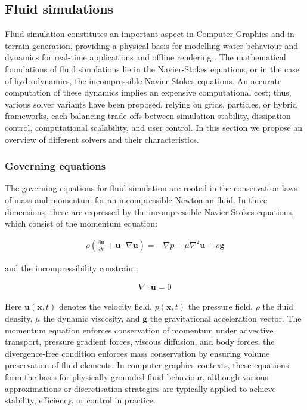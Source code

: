 
\subsection{Fluid simulations}

Fluid simulation constitutes an important aspect in Computer Graphics and in terrain generation, providing a physical basis for modelling water behaviour and dynamics for real-time applications and offline rendering \cite{Wang2024}. The mathematical foundations of fluid simulations lie in the Navier-Stokes equations, or in the case of hydrodynamics, the incompressible Navier-Stokes equations. An accurate computation of these dynamics implies an expensive computational cost; thus, various solver variants have been proposed, relying on grids, particles, or hybrid frameworks, each balancing trade-offs between simulation stability, dissipation control, computational scalability, and user control. In this section we propose an overview of different solvers and their characteristics.

\subsubsection{Governing equations}
The governing equations for fluid simulation are rooted in the conservation laws of mass and momentum for an incompressible Newtonian fluid. In three dimensions, these are expressed by the incompressible Navier-Stokes equations, which consist of the momentum equation:

\begin{align}
    \rho \left(\frac{\partial \mathbf{u}}{\partial t} + \mathbf{u}\cdot\nabla\mathbf{u}\right) = -\nabla p + \mu \nabla^2 \mathbf{u} + \rho \mathbf{g}
\end{align}

and the incompressibility constraint:

\begin{align}
    \nabla\cdot\mathbf{u} = 0
\end{align}

Here $\mathbf{u}(\mathbf{x},t)$ denotes the velocity field, $p(\mathbf{x},t)$ the pressure field, $\rho$ the fluid density, $\mu$ the dynamic viscosity, and $\mathbf{g}$ the gravitational acceleration vector. The momentum equation enforces conservation of momentum under advective transport, pressure gradient forces, viscous diffusion, and body forces; the divergence-free condition enforces mass conservation by ensuring volume preservation of fluid elements. In computer graphics contexts, these equations form the basis for physically grounded fluid behaviour, although various approximations or discretisation strategies are typically applied to achieve stability, efficiency, or control in practice.

